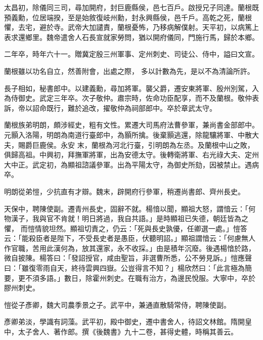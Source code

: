 \begin{pinyinscope}
 太昌初，除儀同三司，尋加開府，封巨鹿縣侯，邑七百戶。啟授兄子同達。蘭根既預義勳，位居端揆，至是始敘復岐州勳，封永興縣侯，邑千戶。高乾之死，蘭根懼，去宅，避於寺。武帝大加譴責，蘭根憂怖，乃移病解僕射。天平初，以病篤上表求還鄉里。魏帝遣舍人石長宣就家勞問，猶以開府儀同，門施行馬，歸於本鄉。



 二年卒，時年六十一。贈冀定殷三州軍事、定州刺史、司徒公、侍中，謚曰文宣。



 蘭根雖以功名自立，然善附會，出處之際，
 多以計數為先，是以不為清論所許。



 長子相如，秘書郎中。以建義勳，尋加將軍。襲父爵，遷安東將軍、殷州別駕，入為侍御史。武定三年卒。次子敬仲。肅宗時，佐命功臣配享，而不及蘭根。敬仲表訴，帝以詔命既行，難於追改，擢敬仲為祠部郎中。卒於章武太守。



 蘭根族弟明朗，頗涉經史，粗有文性。累遷大司馬府法曹參軍，兼尚書金部郎中。元顥入洛陽，明朗為南道行臺郎中，為顥所擒。後棄顥逃還，除龍驤將軍、中散大夫，賜爵巨鹿侯。永安
 末，蘭根為河北行臺，引明朗為左丞。及蘭根中山之敗，俱歸高祖。中興初，拜撫軍將軍，出為安德太守。後轉衛將軍、右光祿大夫、定州大中正。武定初，為顯祖諮議參軍。出為平陽太守，為御史所劾，因被禁止。遇病卒。



 明朗從弟愷，少抗直有才辯。魏末，辟開府行參軍，稍遷尚書郎、齊州長史。



 天保中，聘陳使副。遷青州長史，固辭不就。楊愔以聞，顯祖大怒，謂愔云：「何物漢子，我與官不肯就！明日將過，我自共語。」是時顯祖已失德，朝廷皆為之懼，
 而愷情貌坦然。顯祖切責之，仍云：「死與長史孰優，任卿選一處。」愷答云：「能殺臣者是陛下，不受長史者是愚臣，伏聽明詔。」顯祖謂愔云：「何慮無人作官職，苦用此漢何為，放其還家，永不收採。」由是積年沉廢。後遇楊愔於路，微自披陳。楊答曰：「發詔授官，咸由聖旨，非選曹所悉，公不勞見訴。」愷應聲曰：「雖復零雨自天，終待雲興四嶽。公豈得言不知？」楊欣然曰：「此言極為簡要，更不須多語。」數日，除霍州刺史。在職有治方，為邊民悅服。大寧中，卒於
 膠州刺史。



 愷從子彥卿，魏大司農季景之子。武平中，兼通直散騎常侍，聘陳使副。



 彥卿弟淡，學識有詞藻。武平初，殿中御史，遷中書舍人，待詔文林館。隋開皇中，太子舍人、著作郎。撰《後魏書》九十二卷，甚得史體，時稱其善云。




\end{pinyinscope}
